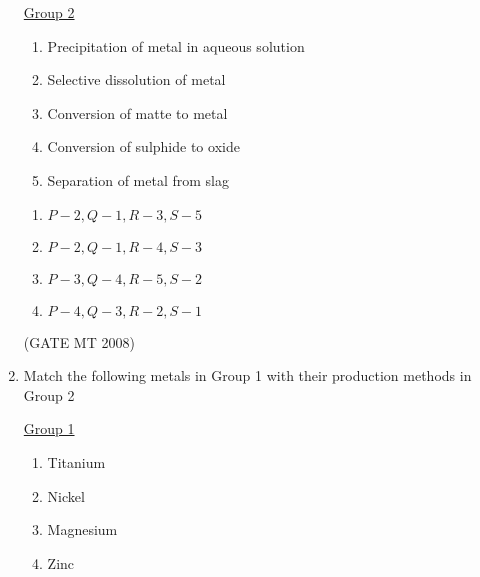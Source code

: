 \documentclass[11pt, letterpaper]{article}
\theoremstyle{remark}
\begin{document}
\begin{enumerate}[label=Q.\arabic*]
\begin{multicols}{2}
     \underline{Group 2}
    \begin{enumerate}[label=(\arabic*), start=1]
        \item Precipitation of metal in aqueous solution
        \item Selective dissolution of metal
        \item Conversion of matte to metal
        \item Conversion of sulphide to oxide 
        \item Separation of metal from slag
    \end{enumerate}
\end{multicols}
\vspace{-2em}
\begin{multicols}{2}
      \begin{enumerate}
        \item $P-2, Q-1, R-3, S-5$
        \item $P-2, Q-1, R-4, S-3$
        \item $P-3, Q-4, R-5, S-2$
        \item $P-4, Q-3, R-2, S-1$
      \end{enumerate}
    \end{multicols}
\vspace{-5mm}
\hfill(GATE MT 2008)

\item Match the following metals in Group 1 with their production methods in Group 2
\begin{multicols}{2}
    \underline{Group 1}
    \begin{enumerate}[label=(\Alph*), start=16]
        \item Titanium
        \item Nickel
        \item Magnesium
        \item Zinc\\
    \end{enumerate}


\end{multicols}
\end{enumerate}
\end{document}

